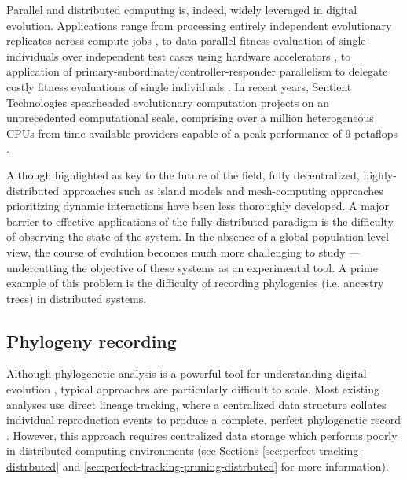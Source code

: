 Parallel and distributed computing is, indeed, widely leveraged in digital evolution.
Applications range from processing entirely independent evolutionary replicates across compute jobs \citep{dolson2017spatial, hornby2006automated}, to data-parallel fitness evaluation of single individuals over independent test cases using hardware accelerators \citep{harding2007fast_springer, langdon2019continuous}, to application of primary-subordinate/controller-responder parallelism to delegate costly fitness evaluations of single individuals \citep{cantu2001master,miikkulainen2019evolving}.
In recent years, Sentient Technologies spearheaded evolutionary computation projects on an unprecedented computational scale, comprising over a million heterogeneous CPUs from time-available providers capable of a peak performance of 9 petaflops \citep{miikkulainen2019evolving,gilbert2015artificial,blondeau2009distributed}.

Although highlighted as key to the future of the field, fully decentralized, highly-distributed approaches such as island models \citep{bennett1999building,schulte2010genetic} and mesh-computing approaches prioritizing dynamic interactions \citep{ray1995proposal,ackley2018digital,moreno2021conduit} have been less thoroughly developed.
A major barrier to effective applications of the fully-distributed paradigm is the difficulty of observing the state of the system. 
In the absence of a global population-level view, the course of evolution becomes much more challenging to study --- undercutting the objective of these systems as an experimental tool.
A prime example of this problem is the difficulty of recording phylogenies (i.e. ancestry trees) in distributed systems.

\subsection{Phylogeny recording}

Although phylogenetic analysis is a powerful tool for understanding digital evolution \citep{dolson2020interpreting}, typical approaches are particularly difficult to scale. %
Most existing analyses use direct lineage tracking, where a centralized data structure collates individual reproduction events to produce a complete, perfect phylogenetic record \citep{dolson2023phylotrackpy}.
However, this approach requires centralized data storage which performs poorly in distributed computing environments (see Sections \ref{sec:perfect-tracking-distrbuted} and \ref{sec:perfect-tracking-pruning-distrbuted} for more information).

